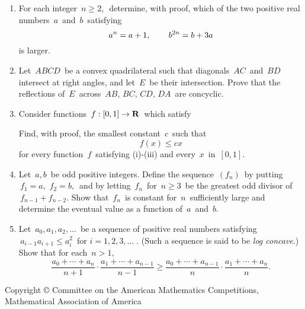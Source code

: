 \begin{enumerate}
\item
For each integer $\, n \geq 2, \,$ determine, with proof, which
of the two positive real numbers $\, a \,$ and $\, b \,$
satisfying
\[
a^n = a + 1,   \hspace{.3in} b^{2n} = b + 3a
\]
is larger. 
\item
Let $\, ABCD \,$ be a convex quadrilateral such that diagonals $\, AC \,$
and $\, BD \,$ intersect at right angles, and let $\, E \,$
be their intersection.  Prove that the reflections of $\, E \,$
across $\, AB, \, BC, \, CD, \, DA \,$ are concyclic.
\item
Consider functions $\, f: [0,1] \rightarrow {\mathbf{R}} \,$ which
satisfy
Find, with proof, the smallest constant $\, c \,$ such that 
\[
f(x) \leq cx
\]
for every function $\, f \,$ satisfying (i)-(iii) and 
every $\, x \,$ in $\, [0,1]$.
\item
Let $\, a,b \,$ be odd positive integers.  Define the sequence
$\, (f_n ) \,$ by putting $\, f_1 = a,$ $f_2 = b, \,$
and by letting $\, f_n \,$ for $\, n \geq 3 \,$ 
be the greatest
odd divisor of $\, f_{n-1} + f_{n-2}$.  Show that
$\, f_n \,$ is constant for $\, n \,$ sufficiently large 
and determine the eventual value as a function of $\, a \,$ and $\,
b$.
\item
Let $\, a_0, a_1, a_2, \ldots \,$ be a sequence of positive real 
numbers satisfying $\, a_{i-1} a_{i+1} \leq a_i^2 \,$ for $i =
1,2,3,\ldots \; .$  (Such a sequence is said to be {\em log
concave}.)  Show that for each $\, n > 1,$
\[
\frac{a_0 + \cdots + a_n}{n+1} \cdot
\frac{a_1 + \cdots + a_{n-1}}{n-1} \geq
\frac{a_0 + \cdots + a_{n-1}}{n} \cdot
\frac{a_1 + \cdots + a_n}{n}.
\]
\end{enumerate}
\vspace*{\fill}
\begin{center}
{\footnotesize Copyright \copyright \hspace{.05in} Committee on
the American
Mathematics Competitions, \\ Mathematical Association of America}
\end{center}


